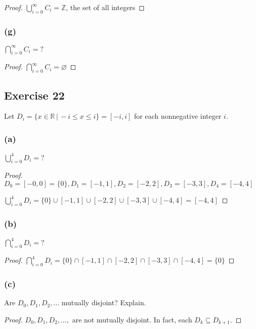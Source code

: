 \documentclass[14pt]{extarticle}
\newcommand{\es}{\varnothing}
\newcommand{\dps}{\displaystyle}
\newcommand{\R}{\mathbb{R}}
\newcommand{\Z}{\mathbb{Z}}
\begin{document}
\begin{proof}
  \(\dps \bigcup_{i=0}^{\infty}C_i = \Z\), the set of all integers
\end{proof}

\subsubsection{(g)}
\(\dps \bigcap_{i=0}^{\infty}C_i = ?\)

\begin{proof}
  \(\dps \bigcap_{i=0}^{\infty}C_i = \es\)
\end{proof}

\subsection{Exercise 22}
Let \(D_i = \{x \in \R \,|\, -i \leq x \leq i\} = [-i, i]\) for each nonnegative integer $i$.

\subsubsection{(a)}
\(\dps \bigcup_{i=0}^{4}D_i = ?\)

\begin{proof}
  \(D_0 = [-0, 0] = \{0\}, D_1 = [-1, 1], D_2 = [-2, 2], D_3 = [-3, 3], D_4 = [-4, 4]\)

  \(\dps \bigcup_{i=0}^{4}D_i = \{0\} \cup [-1, 1] \cup [-2, 2] \cup [-3, 3] \cup [-4, 4] = [-4, 4]\)
\end{proof}

\subsubsection{(b)}
\(\dps \bigcap_{i=0}^{4}D_i = ?\)

\begin{proof}
  \(\dps \bigcap_{i=0}^{4}D_i = \{0\} \cap [-1, 1] \cap [-2, 2] \cap [-3, 3] \cap [-4, 4] = \{0\}\)
\end{proof}

\subsubsection{(c)}
Are \(D_0, D_1, D_2, \ldots\) mutually disjoint? Explain.

\begin{proof}
  $D_0, D_1, D_2, \ldots,$ are not mutually disjoint. In fact, each \(D_k \subseteq D_{k+1}\).
\end{proof}
\end{document}
